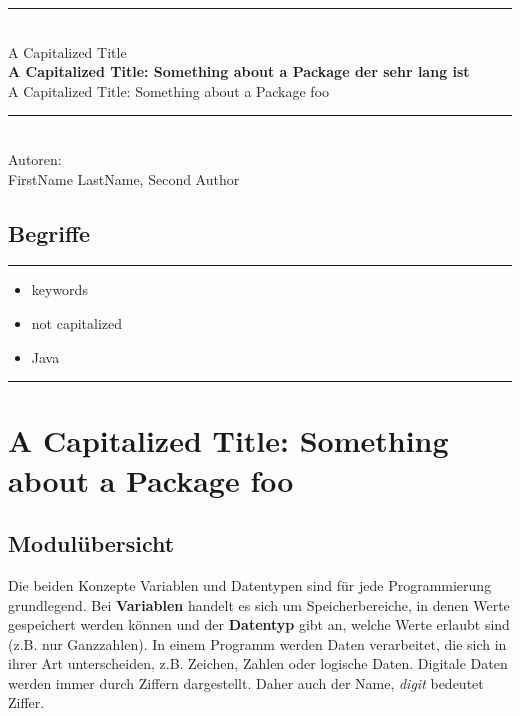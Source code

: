 \documentclass[10pt,paper=17cm:22cm, twoside=true, DIV=14]{scrbook}
\begin{document}
\begin{center} \noindent\rule{\textwidth}{0.4pt}\\ \vspace{0.5 cm} {\large \textsf{ A Capitalized Title }}\\ \vspace{0.5 cm} {\LARGE \textbf{ \textsf{ A Capitalized Title: Something about a Package der sehr lang ist  }}}\\ \vspace{0.5 cm} {\Large \textsf{ A Capitalized Title: Something about a Package foo }}\\ \noindent\rule{\textwidth}{0.4pt}\\ \vspace{1 cm}Autoren: \\ \vspace{2 mm} FirstName LastName, Second Author \\ \end{center}

\section*{Begriffe}

\begin{minipage}{\textwidth} \hrule \begin{multicols}{2} \begin{itemize}[leftmargin=0mm] \item[] keywords \item[] not capitalized \item[] Java \end{itemize} \end{multicols} \vspace{-2mm} \hrule \end{minipage}

\clearpage \begingroup \let\clearpage\relax \let\cleardoublepage\relax \chapter{ A Capitalized Title: Something about a Package foo } \endgroup 

\section{Modulübersicht}\label{modulubersicht}

Die beiden Konzepte Variablen und Datentypen sind für jede
Programmierung grundlegend. Bei \textbf{Variablen} handelt es sich um
Speicherbereiche, in denen Werte gespeichert werden können und der
\textbf{Datentyp} gibt an, welche Werte erlaubt sind (z.B. nur
Ganzzahlen). In einem Programm werden Daten verarbeitet, die sich in
ihrer Art unterscheiden, z.B. Zeichen, Zahlen oder logische Daten.
Digitale Daten werden immer durch Ziffern dargestellt. Daher auch der
Name, \emph{digit} bedeutet Ziffer.
\end{document}

